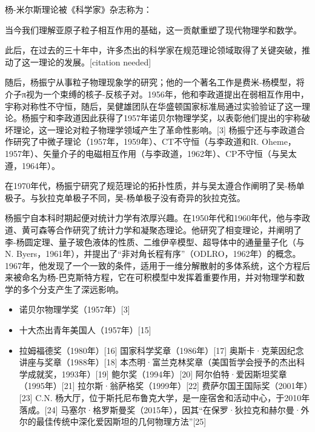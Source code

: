 杨-米尔斯理论被《科学家》杂志称为：

当今我们理解亚原子粒子相互作用的基础，这一贡献重塑了现代物理学和数学。

此后，在过去的三十年中，许多杰出的科学家在规范理论领域取得了关键突破，推动了这一理论的发展。[citation needed]

随后，杨振宁从事粒子物理现象学的研究；他的一个著名工作是费米-杨模型，将介子π视为一个束缚的核子-反核子对。1956年，他和李政道提出在弱相互作用中，宇称对称性不守恒，随后，吴健雄团队在华盛顿国家标准局通过实验验证了这一理论。杨振宁和李政道因此获得了1957年诺贝尔物理学奖，以表彰他们提出的宇称破坏理论，这一理论对粒子物理学领域产生了革命性影响。[3] 杨振宁还与李政道合作研究了中微子理论（1957年，1959年）、CT不守恒（与李政道和R. Oheme，1957年）、矢量介子的电磁相互作用（与李政道，1962年）、CP不守恒（与吴太遵，1964年）。

在1970年代，杨振宁研究了规范理论的拓扑性质，并与吴太遵合作阐明了吴-杨单极子。与狄拉克单极子不同，吴-杨单极子没有奇异的狄拉克弦。

杨振宁自本科时期起便对统计力学有浓厚兴趣。在1950年代和1960年代，他与李政道、黄可森等合作研究了统计力学和凝聚态理论。他研究了相变理论，并阐明了李-杨圆定理、量子玻色液体的性质、二维伊辛模型、超导体中的通量量子化（与N. Byers，1961年），并提出了“非对角长程有序”（ODLRO，1962年）的概念。1967年，他发现了一个一致的条件，适用于一维分解散射的多体系统，这个方程后来被命名为杨-巴克斯特方程，它在可积模型中发挥着重要作用，并对物理学和数学的多个分支产生了深远影响。


\begin{itemize}
\item 诺贝尔物理学奖（1957年）[3]  
\item 十大杰出青年美国人（1957年）[15]  
\item 拉姆福德奖（1980年）[16]  
国家科学奖章（1986年）[17]  
奥斯卡·克莱因纪念讲座与奖章（1988年）[18]  
本杰明·富兰克林奖章（美国哲学会授予的杰出科学成就奖，1993年）[19]  
鲍尔奖（1994年）[20]  
阿尔伯特·爱因斯坦奖章（1995年）[21]  
拉尔斯·翁萨格奖（1999年）[22]  
费萨尔国王国际奖（2001年）[23]  
C.N. 杨大厅，位于斯托尼布鲁克大学，是一座宿舍和活动中心，于2010年落成。[24]  
马塞尔·格罗斯曼奖（2015年），因其“在保罗·狄拉克和赫尔曼·外尔的最佳传统中深化爱因斯坦的几何物理方法”[25]
\end{itemize}